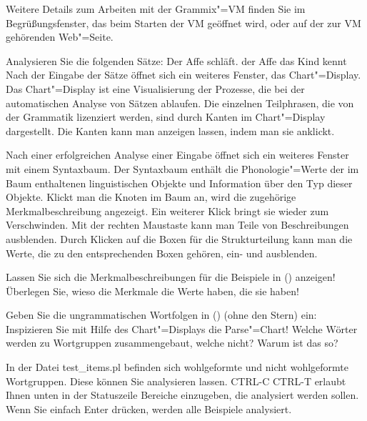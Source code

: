 {\begin{enumerate}
      Weitere Details zum Arbeiten mit der Grammix"=VM finden Sie im Begrüßungsfenster,
      das beim Starten der VM geöffnet wird, oder auf der zur VM gehörenden Web"=Seite.

      Analysieren Sie die folgenden Sätze:
      \eal
      \ex Der Affe schläft.
      \ex der Affe das Kind kennt
      \zl
      Nach der Eingabe der Sätze öffnet sich ein weiteres Fenster, das Chart"=Display.
      Das Chart"=Display ist eine Visualisierung der Prozesse, die bei der automatischen
      Analyse von Sätzen ablaufen. Die einzelnen Teilphrasen, die von der
      Grammatik lizenziert werden, sind durch Kanten im Chart"=Display dargestellt. Die Kanten
      kann man anzeigen lassen, indem man sie anklickt.

      Nach einer erfolgreichen Analyse einer Eingabe öffnet sich ein weiteres Fenster mit einem
      Syntaxbaum. Der Syntaxbaum enthält die Phonologie"=Werte der im Baum enthaltenen
      linguistischen Objekte und Information über den Typ dieser Objekte.
      Klickt man die Knoten im Baum an, wird die zugehörige Merkmalbeschreibung
      angezeigt. Ein weiterer Klick bringt sie wieder zum Verschwinden. Mit der rechten Maustaste
      kann man Teile von Beschreibungen ausblenden. Durch Klicken auf die Boxen für die Strukturteilung
      kann man die Werte, die zu den entsprechenden Boxen gehören, ein- und ausblenden.

      Lassen Sie sich die Merkmalbeschreibungen für die Beispiele in () anzeigen!
      Überlegen Sie, wieso die Merkmale die Werte haben, die sie haben!
      
      Geben Sie die ungrammatischen Wortfolgen in () (ohne den Stern) ein:
      \eal
      \zl
      Inspizieren Sie mit Hilfe des Chart"=Displays die Parse"=Chart! Welche Wörter
      werden zu Wortgruppen zusammengebaut, welche nicht? Warum ist das so?

      In der Datei test\_items.pl befinden sich wohlgeformte und nicht wohlgeformte
      Wortgruppen. Diese können Sie analysieren lassen. CTRL-C CTRL-T erlaubt Ihnen unten in der
      Statuszeile Bereiche einzugeben, die analysiert werden sollen. Wenn Sie einfach Enter drücken,
      werden alle Beispiele analysiert.
\end{enumerate}
}
